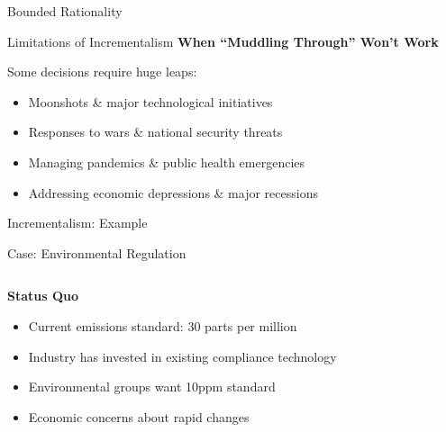 \documentclass[10pt]{beamer}
\begin{document}
\begin{frame}{Bounded Rationality}
\begin{frame}{Limitations of Incrementalism}
\vspace{0.5cm}
\textbf{When ``Muddling Through'' Won't Work}

Some decisions require huge leaps:
\begin{itemize}
\item Moonshots \& major technological initiatives
\item Responses to wars \& national security threats
\item Managing pandemics \& public health emergencies
\item Addressing economic depressions \& major recessions
\end{itemize}
\end{frame}

\begin{frame}{Incrementalism: Example}
\begin{block}{Case: Environmental Regulation}
\end{block}

\begin{columns}
\begin{column}{0.5\textwidth}
\textbf{Status Quo}
\begin{itemize}
\item Current emissions standard: 30 parts per million
\item Industry has invested in existing compliance technology
\item Environmental groups want 10ppm standard
\item Economic concerns about rapid changes
\end{itemize}
\end{column}
\begin{column}{0.5\textwidth}
\begin{center}
\end{center}


\end{column}
\end{columns}
\end{frame}
\end{frame}
\end{document}
